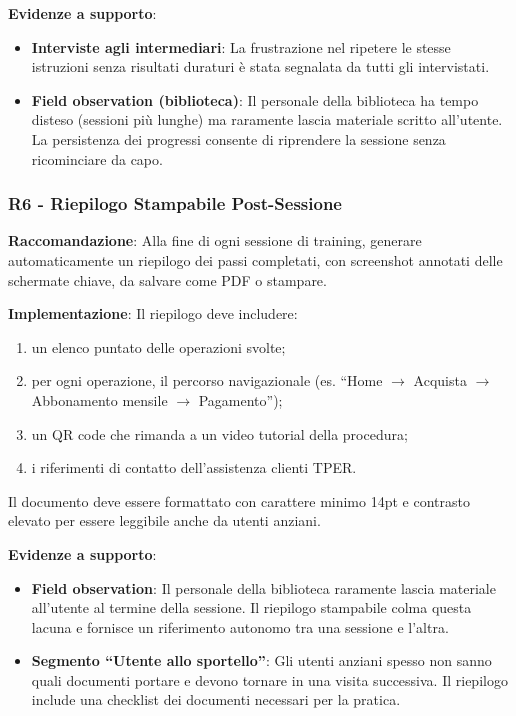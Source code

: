 \documentclass[11pt,a4paper]{article}
\begin{document}
\textbf{Evidenze a supporto}:
\begin{itemize}
    \item \textbf{Interviste agli intermediari}: La frustrazione nel ripetere
    le stesse istruzioni senza risultati duraturi \`e stata segnalata da tutti
    gli intervistati.
    \item \textbf{Field observation (biblioteca)}: Il personale della biblioteca
    ha tempo disteso (sessioni pi\`u lunghe) ma raramente lascia materiale
    scritto all'utente. La persistenza dei progressi consente di
    riprendere la sessione senza ricominciare da capo.
\end{itemize}

\subsubsection{R6 - Riepilogo Stampabile Post-Sessione}
\label{rec:R6}

\textbf{Raccomandazione}: Alla fine di ogni sessione di training, generare
automaticamente un riepilogo dei passi completati, con screenshot annotati
delle schermate chiave, da salvare come PDF o stampare.

\textbf{Implementazione}: Il riepilogo deve includere:
\begin{enumerate}
    \item un elenco puntato delle operazioni svolte;
    \item per ogni operazione, il percorso navigazionale (es.
    “Home $\rightarrow$ Acquista $\rightarrow$ Abbonamento mensile $\rightarrow$ Pagamento”);
    \item un QR code che rimanda a un video tutorial della procedura;
    \item i riferimenti di contatto dell'assistenza clienti TPER.
\end{enumerate}
Il documento deve essere formattato con carattere minimo 14pt e contrasto
elevato per essere leggibile anche da utenti anziani.

\textbf{Evidenze a supporto}:
\begin{itemize}
    \item \textbf{Field observation}: Il personale della biblioteca raramente lascia
    materiale all'utente al termine della sessione. Il riepilogo stampabile
    colma questa lacuna e fornisce un riferimento autonomo tra una sessione
    e l'altra.
    \item \textbf{Segmento “Utente allo sportello”}: Gli utenti anziani spesso
    non sanno quali documenti portare e devono tornare in una visita
    successiva. Il riepilogo include una checklist dei documenti necessari
    per la pratica.
\end{itemize}
\end{document}
